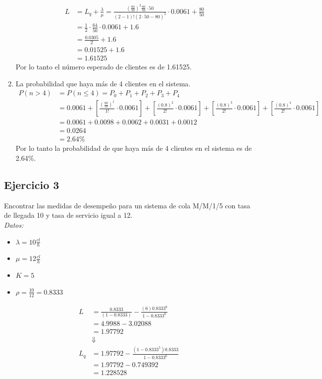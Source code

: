 \documentclass{templateNote}
\begin{document}
\begin{enumerate}[label=(\alph*)]
    \begin{align*}
        L &= L_q + \frac{\lambda}{\mu} = \frac{(\frac{80}{50})^2 \frac{80}{50} \cdot 50}{(2-1)! (2\cdot50-80)^2} \cdot 0.0061 + \frac{80}{50} \\
        &= \frac{1}{2} \cdot \frac{64}{50} \cdot 0.0061 + 1.6 \\
        &= \frac{0.0305}{2} + 1.6 \\
        &= 0.01525 + 1.6 \\
        &= 1.61525
    \end{align*}
    Por lo tanto el número esperado de clientes es de 1.61525.
    \item La probabilidad que haya más de 4 clientes en el sistema.
        \begin{align*}
            P(n>4) &= P(n\leq4) = P_0 + P_1 + P_2 + P_3 + P_4 \\
            &= 0.0061 + [\frac{(\frac{80}{50})^1}{1!}\cdot0.0061] + [\frac{(0.8)^2}{2!}\cdot0.0061] + [\frac{(0.8)^3}{2!}\cdot0.0061] + [\frac{(0.8)^4}{2!}\cdot0.0061]\\
            &= 0.0061 + 0.0098 + 0.0062 + 0.0031 + 0.0012 \\
            &= 0.0264 \\
            &= 2.64\%
        \end{align*}
    Por lo tanto la probabilidad de que haya más de 4 clientes en el sistema es de 2.64\%.
\end{enumerate}

\newpage
\subsection{Ejercicio 3}
\noindent Encontrar las medidas de desempeño para un sistema de cola M/M/1/5 con tasa de llegada 10 y tasa de servicio igual a 12. \\

\textit{Datos:}
\begin{itemize}
    \item $\lambda = 10 \frac{cl}{h}$
    \item $\mu = 12 \frac{cl}{h}$
    \item $K = 5$
    \item $\rho = \frac{10}{12} = 0.8333$
\end{itemize}

\begin{mdframed}
    \begin{align*}
        L &= \frac{0.8333}{(1-0.8333)} - \frac{(6)0.8333^{6}}{1-0.8333^6} \\
        &= 4.9988 - 3.02088 \\
        &= 1.97792 \\
        &\Downarrow \\
        L_q &= 1.97792 - \frac{(1-0.8333^5)0.8333}{1-0.8333^6} \\
        &= 1.97792 - 0.749392 \\
        &= 1.228528
    \end{align*}
\end{mdframed}
\end{document}
